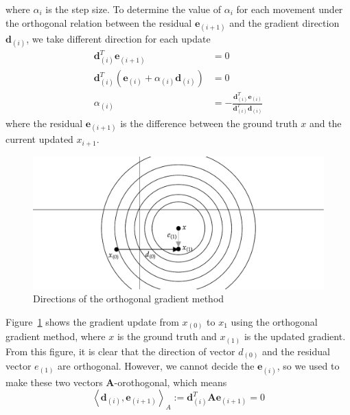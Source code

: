 where $\alpha_i$ is the step size. To determine the value of $\alpha_i$ for each movement under the orthogonal relation between the residual $\mathbf{e}_{(i+1)}$ and the gradient direction $\mathbf{d}_{(i)}$, we take different direction for each update
\begin{equation}
    \begin{aligned} 
        \mathbf{d}_{(i)}^{T} \mathbf{e}_{(i+1)} &=0 \\ \mathbf{d}_{(i)}^{T}\left(\mathbf{e}_{(i)}+\alpha_{(i)} \mathbf{d}_{(i)}\right) &=0 \\ \alpha_{(i)} &=-\frac{\mathbf{d}_{(i)}^{T} \mathbf{e}_{(i)}}{\mathbf{d}_{(i)}^{T} \mathbf{d}_{(i)}} 
    \end{aligned}
\end{equation}
where the residual $\mathbf{e}_{(i+1)}$ is the difference between the ground truth $x$ and the current updated $x_{i+1}$. 
\begin{figure}[t]
    \label{fig:ortho-gradient}
    \centering
    \includegraphics[page=1, width=.8\textwidth]{figs/orthogonal-gradient.pdf}
    \caption{Directions of the orthogonal gradient method}
\end{figure}
\par Figure~\ref{fig:ortho-gradient} shows the gradient update from $x_{(0)}$ to $x_{1}$ using the orthogonal gradient method, where $x$ is the ground truth and $x_{(1)}$ is the updated gradient. From this figure, it is clear that the direction of vector $d_{(0)}$ and the residual vector $e_{(1)}$ are orthogonal. However, we cannot decide the $\mathbf{e}_{(i)}$, so we used to make these two vectors $\mathbf{A}$-orothogonal, which means
\begin{equation}
    \label{equ:a-otho}
    \left\langle\mathbf{d}_{(i)}, \mathbf{e}_{(i+1)}\right\rangle_{A}:=\mathbf{d}_{(i)}^{T} \mathbf{A} \mathbf{e}_{(i+1)}=0
\end{equation}
